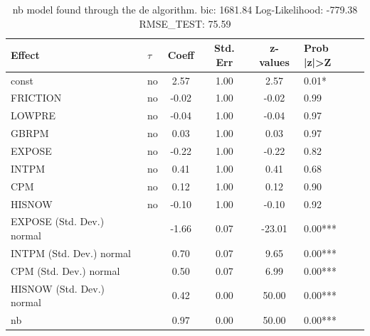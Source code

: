 \begin{table}
	\caption{nb model found through the de algorithm. bic: 1681.84 Log-Likelihood: -779.38 RMSE_TEST: 75.59}
	\begin{center}
		\begin{tabular}{|l|l|c|c|c|l|}
			\hline
			Effect & $\tau$ & Coeff & Std. Err & z-values & Prob |z|>Z \\
			\hline
			const & no & 2.57 & 1.00 & 2.57 & 0.01* \\
			\hline
			FRICTION & no & -0.02 & 1.00 & -0.02 & 0.99 \\
			\hline
			LOWPRE & no & -0.04 & 1.00 & -0.04 & 0.97 \\
			\hline
			GBRPM & no & 0.03 & 1.00 & 0.03 & 0.97 \\
			\hline
			EXPOSE & no & -0.22 & 1.00 & -0.22 & 0.82 \\
			\hline
			INTPM & no & 0.41 & 1.00 & 0.41 & 0.68 \\
			\hline
			CPM & no & 0.12 & 1.00 & 0.12 & 0.90 \\
			\hline
			HISNOW & no & -0.10 & 1.00 & -0.10 & 0.92 \\
			\hline
			EXPOSE (Std. Dev.) normal &  & -1.66 & 0.07 & -23.01 & 0.00*** \\
			\hline
			INTPM (Std. Dev.) normal &  & 0.70 & 0.07 & 9.65 & 0.00*** \\
			\hline
			CPM (Std. Dev.) normal &  & 0.50 & 0.07 & 6.99 & 0.00*** \\
			\hline
			HISNOW (Std. Dev.) normal &  & 0.42 & 0.00 & 50.00 & 0.00*** \\
			\hline
			nb &  & 0.97 & 0.00 & 50.00 & 0.00*** \\
			\hline
		\end{tabular}
	\end{center}
\end{table}